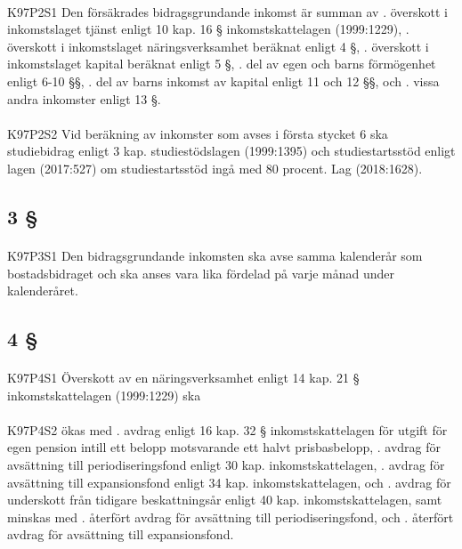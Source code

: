 \documentclass[a4paper,notitlepage,openany,10pt]{book}
\begin{document}
\paragraph*{}
{\tiny K97P2S1}
Den försäkrades bidragsgrundande inkomst är summan av
. överskott i inkomstslaget tjänst enligt 10 kap. 16 § inkomstskattelagen (1999:1229),
. överskott i inkomstslaget näringsverksamhet beräknat enligt 4 §,
. överskott i inkomstslaget kapital beräknat enligt 5 §,
. del av egen och barns förmögenhet enligt 6-10 §§,
. del av barns inkomst av kapital enligt 11 och 12 §§, och
. vissa andra inkomster enligt 13 §.
\paragraph*{}
{\tiny K97P2S2}
Vid beräkning av inkomster som avses i första stycket 6 ska studiebidrag enligt 3 kap. studiestödslagen (1999:1395) och studiestartsstöd enligt lagen (2017:527) om studiestartsstöd ingå med 80 procent.
Lag (2018:1628).
\subsection*{3 §}
\paragraph*{}
{\tiny K97P3S1}
Den bidragsgrundande inkomsten ska avse samma kalenderår som bostadsbidraget och ska anses vara lika fördelad på varje månad under kalenderåret.
\subsection*{4 §}
\paragraph*{}
{\tiny K97P4S1}
Överskott av en näringsverksamhet enligt 14 kap. 21 § inkomstskattelagen (1999:1229) ska
\paragraph*{}
{\tiny K97P4S2}
ökas med
. avdrag enligt 16 kap. 32 § inkomstskattelagen för utgift för egen pension intill ett belopp motsvarande ett halvt prisbasbelopp,
. avdrag för avsättning till periodiseringsfond enligt 30 kap. inkomstskattelagen,
. avdrag för avsättning till expansionsfond enligt 34 kap.
inkomstskattelagen, och
. avdrag för underskott från tidigare beskattningsår enligt 40 kap. inkomstskattelagen,
samt minskas med
. återfört avdrag för avsättning till periodiseringsfond, och
. återfört avdrag för avsättning till expansionsfond.
\end{document}
